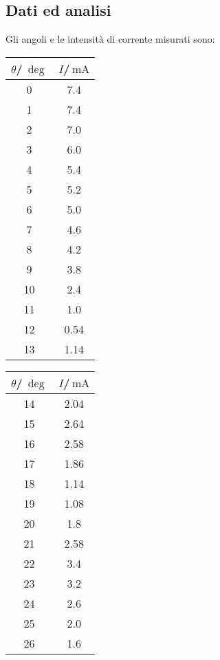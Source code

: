 \documentclass[a4paper]{article}
\begin{document}
\subsection{Dati ed analisi}
Gli angoli e le intensità di corrente misurati sono:
\begin{center}
\begin{tabular}[h]{c|c}
	$\theta$/$\SI{}{\deg}$ & $I$/$\SI{}{\mA}$ \\\midrule
	\SI{0}{} & \SI{7.4}{} \\
	\SI{1}{} & \SI{7.4}{} \\
	\SI{2}{} & \SI{7.0}{} \\
	\SI{3}{} & \SI{6.0}{} \\
	\SI{4}{} & \SI{5.4}{} \\
	\SI{5}{} & \SI{5.2}{} \\
	\SI{6}{} & \SI{5.0}{} \\
	\SI{7}{} & \SI{4.6}{} \\
	\SI{8}{} & \SI{4.2}{} \\
	\SI{9}{} & \SI{3.8}{} \\
	\SI{10}{} & \SI{2.4}{} \\
	\SI{11}{} & \SI{1.0}{} \\
	\SI{12}{} & \SI{0.54}{} \\
	\SI{13}{} & \SI{1.14}{} \\
\end{tabular}\quad
\begin{tabular}[h]{c|c}
	$\theta$/$\SI{}{\deg}$ & $I$/$\SI{}{\mA}$ \\\midrule
	\SI{14}{} & \SI{2.04}{} \\
	\SI{15}{} & \SI{2.64}{} \\
	\SI{16}{} & \SI{2.58}{} \\
	\SI{17}{} & \SI{1.86}{} \\
	\SI{18}{} & \SI{1.14}{} \\
	\SI{19}{} & \SI{1.08}{} \\
	\SI{20}{} & \SI{1.8}{} \\
	\SI{21}{} & \SI{2.58}{} \\
	\SI{22}{} & \SI{3.4}{} \\
	\SI{23}{} & \SI{3.2}{} \\
	\SI{24}{} & \SI{2.6}{} \\
	\SI{25}{} & \SI{2.0}{} \\
	\SI{26}{} & \SI{1.6}{} \\

\end{tabular}
\end{center}
\end{document}
